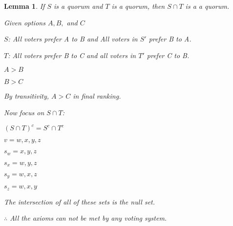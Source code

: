 \documentclass[twoside]{article}
\newtheorem{lemma}[theorem]{Lemma}
\begin{document}
\begin{lemma}
If $S$ is a quorum and $T$ is a quorum, then $S\cap T$ is a a quorum.

Given options $A, B,$ and $C$

$S$:  All voters prefer A to B and All voters in $S'$ prefer B to A.

$T$: All voters prefer B to C and all voters in $T'$ prefer C to B.

\centering
$A > B$ 

$B > C$

By transitivity, $A > C$ in final ranking.

Now focus on $S \cap T$:

$(S \cap T)^c = S^c \cap T^c$

$v = {w, x, y, z}$

$s_w={x,y,z}$

$s_x = {w,y,z}$

$s_y = {w,x,z}$

$s_z = {w,x,y}$

The intersection of all of these sets is the null set.

$\therefore$ All the axioms can not be met by any voting system.

\end{lemma}
\end{document}
